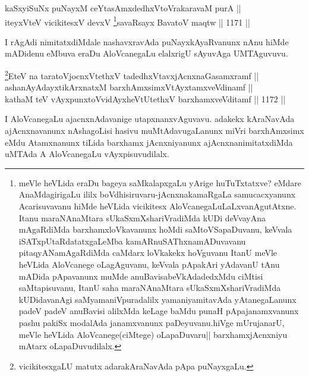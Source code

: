 
\begin{shl}
kaSxyiSuNx puNayxM ceYtasAmxdedhxVtoVrakaravaM purA ||  \\
iteyxVteV vicikitesxV devxV \footnote{meVle heVLida eraDu bageya saMkalapxgaLu yArige huTuTxtatxve? eMdare AnaMdagirigaLu ililx boVdhisiruvaru-jAcnxnakamaRgaLa samucacxyanunx Acarisuvavanu hiMde heVLida vicikitesx AloVcanegaLuLaLxvanAgutAtxne. Itanu maraNAnaMtara sUkaSxmXshariVradiMda kUDi deVvayAna mAgaRdiMda barxhamxloVkavanunx hoMdi saMtoVSapaDuvanu, keVvala iSATxpUtaRdatatxgaLeMba kamARnuSAThxnamADuvavanu pitaqyANamAgaRdiMda caMdarx loVkakekx hoVguvanu ItanU meVle heVLida AloVcanege oLagAguvanu, keVvala pApakAri yAdavanU tAnu mADida pApavanunx muMde anuBavisabeVkAdadedxMdu ciMtisi saMtapisuvanu, ItanU saha maraNAnaMtara sUkaSxmXshariVradiMda kUDidavanAgi saMyamaniVpuradalilx yamaniyamitavAda yAtanegaLanunx padeV padeV anuBavisi alilxMda keLage baMdu punaH pApajanamxvanunx pashu pakiSx modalAda janamxvanunx paDeyuvanu.hiVge mUrujanarU, meVle heVLida AloVcanege(ciMtege) oLapaDuvaru|| barxhamxjAcnxniyu mAtarx oLapaDuvudilalx.}savaRsayx BavatoV maqtw \hfill || 1171 ||  
\end{shl}


\begin{artha}
I rAgAdi nimitatxdiMdale nashavxravAda puNayxkAyaRvanunx nAnu hiMde mADidenu eMbuva eraDu AloVcanegaLu elalxrigU sAyuvAga UMTAguvuvu.
\end{artha}


\begin{shl}
\footnote{vicikitesxgaLU matutx adarakAraNavAda pApa puNayxgaLu.}EteV na taratoV\s jocnxVtethxV tadedhxVtavxjAcnxnaGasamxramf || \\
ashanAyAdayxtikArxnatxM barxhAmxsimxVtAyxtamxveVdinamf || \\
kathaM teV vAyxpunxtoV\s vidAyxheVtUtethxV barxhamxveVditamf \hfill || 1172 ||  
\end{shl}

\begin{artha}
I AloVcanegaLu ajacnxnAdavanige utapxnanxvAguvavu. adakekx kAraNavAda ajAcnxnavanunx nAshagoLisi hasivu muMtAdavugaLanunx miVri barxhAmxsimx eMdu Atamxnanunx tiLida barxhamx jAcnxniyanunx ajAcnxnanimitatxdiMda uMTAda A AloVcanegaLu vAyxpisuvudilalx.
\end{artha}


